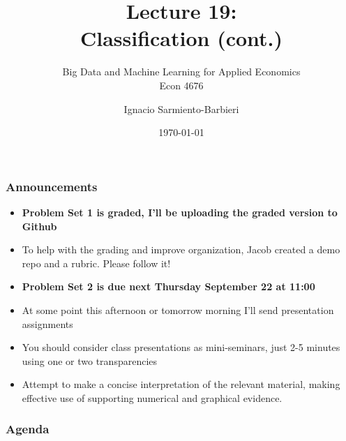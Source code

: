\documentclass[
  shownotes,
  xcolor={svgnames},
  hyperref={colorlinks,citecolor=DarkBlue,linkcolor=DarkRed,urlcolor=DarkBlue}
  , aspectratio=169]{beamer}
\begin{document}
 
\title[Lecture 19]{Lecture 19: \\ Classification (cont.)}
\subtitle{Big Data and Machine Learning for Applied Economics \\ Econ 4676}
\date{\today}

\author[Sarmiento-Barbieri]{Ignacio Sarmiento-Barbieri}


\begin{frame}[noframenumbering]
\maketitle
\end{frame}



\begin{frame}
\frametitle{Announcements}

  
\begin{itemize} 
    \item {\bf Problem Set 1 is graded, I'll be uploading the graded version to Github} 
    \medskip
    \item  To help with the grading and improve organization, Jacob created a demo repo and a rubric. Please follow it!
    \medskip
    \item {\bf Problem Set 2 is due next Thursday September 22 at 11:00} 
    \medskip
    \item At some point this afternoon or tomorrow morning I'll send presentation assignments
    \medskip
    \item  You should consider class presentations as mini-seminars, just 2-5 minutes using one or two transparencies
    \medskip
    \item  Attempt to make a concise interpretation of the relevant material, making effective use of supporting numerical and graphical evidence.    
\end{itemize}
  
\end{frame}


\begin{frame}
\frametitle{Agenda}

\tableofcontents

\end{frame}
\end{document}
